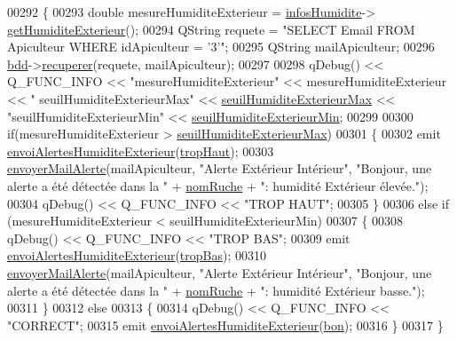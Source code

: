 \begin{DoxyCode}
00292 \{
00293     \textcolor{keywordtype}{double} mesureHumiditeExterieur = \hyperlink{class_alertes_a7b6d798ca0629b474120cd55eb8b510c}{infosHumidite}->
      \hyperlink{class_infos_humidite_a23e537fdfa33336a3970838f445387ce}{getHumiditeExterieur}();
00294     QString requete = \textcolor{stringliteral}{"SELECT Email FROM Apiculteur WHERE idApiculteur = '3'"};
00295     QString mailApiculteur;
00296     \hyperlink{class_alertes_a91e58b69d29922e8e984efb767ae5268}{bdd}->\hyperlink{class_base_de_donnees_a77539baad389f5acf754cd2cd452403e}{recuperer}(requete, mailApiculteur);
00297 
00298     qDebug() << Q\_FUNC\_INFO << \textcolor{stringliteral}{"mesureHumiditeExterieur"} << mesureHumiditeExterieur << \textcolor{stringliteral}{"
      seuilHumiditeExterieurMax"} << \hyperlink{class_alertes_afa54793d1f47a97894faf91e76fb2a04}{seuilHumiditeExterieurMax} << \textcolor{stringliteral}{"seuilHumiditeExterieurMin"} << 
      \hyperlink{class_alertes_a18afbc02513a6e4fa8baa665092719c9}{seuilHumiditeExterieurMin};
00299 
00300     \textcolor{keywordflow}{if}(mesureHumiditeExterieur > \hyperlink{class_alertes_afa54793d1f47a97894faf91e76fb2a04}{seuilHumiditeExterieurMax})
00301     \{
00302         emit \hyperlink{class_alertes_a9a4f2ada9fbf4cf505d6d94831d8e413}{envoiAlertesHumiditeExterieur}(\hyperlink{parametres_8h_aaa6de8207c94675264c90b10b613368dabc650d9700ae19f2696e6a6e3f9ab067}{tropHaut});
00303         \hyperlink{class_alertes_a375783502a78109f3323dc1ed90cfdc9}{envoyerMailAlerte}(mailApiculteur, \textcolor{stringliteral}{"Alerte Extérieur Intérieur"}, \textcolor{stringliteral}{"Bonjour, une
       alerte a été détectée dans la "}  + \hyperlink{class_alertes_a212f2a7185bcc7b11f3e54200272bdcf}{nomRuche} +  \textcolor{stringliteral}{": humidité Extérieur élevée."});
00304         qDebug() << Q\_FUNC\_INFO << \textcolor{stringliteral}{"TROP HAUT"};
00305     \}
00306     \textcolor{keywordflow}{else} \textcolor{keywordflow}{if} (mesureHumiditeExterieur < seuilHumiditeExterieurMin)
00307     \{
00308         qDebug() << Q\_FUNC\_INFO << \textcolor{stringliteral}{"TROP BAS"};
00309         emit \hyperlink{class_alertes_a9a4f2ada9fbf4cf505d6d94831d8e413}{envoiAlertesHumiditeExterieur}(\hyperlink{parametres_8h_aaa6de8207c94675264c90b10b613368da4257e2f8921856770c8266f55c937295}{tropBas});
00310         \hyperlink{class_alertes_a375783502a78109f3323dc1ed90cfdc9}{envoyerMailAlerte}(mailApiculteur, \textcolor{stringliteral}{"Alerte Extérieur Intérieur"}, \textcolor{stringliteral}{"Bonjour, une
       alerte a été détectée dans la "}  + \hyperlink{class_alertes_a212f2a7185bcc7b11f3e54200272bdcf}{nomRuche} +  \textcolor{stringliteral}{": humidité Extérieur basse."});
00311     \}
00312     \textcolor{keywordflow}{else}
00313     \{
00314         qDebug() << Q\_FUNC\_INFO << \textcolor{stringliteral}{"CORRECT"};
00315         emit \hyperlink{class_alertes_a9a4f2ada9fbf4cf505d6d94831d8e413}{envoiAlertesHumiditeExterieur}(\hyperlink{parametres_8h_aaa6de8207c94675264c90b10b613368da5ac8ec3b54d90a07c6bb5a77ef971821}{bon});
00316     \}
00317 \}
\end{DoxyCode}
